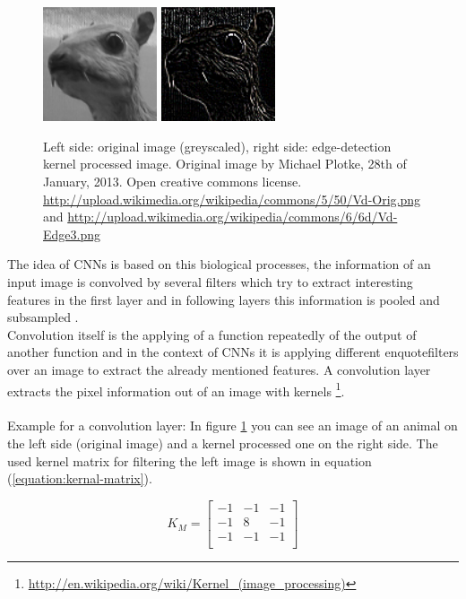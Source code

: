 \documentclass[12pt,twoside]{article}
\theoremstyle{plain}
\theoremstyle{definition}
\theoremstyle{remark}
\begin{document}
\begin{figure}
	\centerline{
		\includegraphics[width=0.3\textwidth]{animal-original.png}
		\qquad
		\includegraphics[width=0.3\textwidth]{animal-edge-detection.png}
	}
	{\caption{Left side: original image (greyscaled), right side: edge-detection kernel processed image. Original image by Michael Plotke, 28th of January, 2013. Open creative commons license.
			\protect\url{http://upload.wikimedia.org/wikipedia/commons/5/50/Vd-Orig.png} and \protect\url{http://upload.wikimedia.org/wikipedia/commons/6/6d/Vd-Edge3.png}}\label{fig:animal-edge-detection}}
\end{figure}
The idea of CNNs is based on this biological processes, the information of an input image is convolved by several filters which try to extract interesting features in the first layer and in following layers this information is pooled and subsampled \cite{ImangeNetClassificationCNN-Krizhevsky}.
\\
Convolution itself is the applying of a function repeatedly of the output of another function and in the context of CNNs it is applying different enquote{filters} over an image to extract the already mentioned features. A convolution layer extracts the pixel information out of an image with kernels \footnote{\url{http://en.wikipedia.org/wiki/Kernel_(image_processing)}}.
\\
\\
Example for a convolution layer: In figure \ref{fig:animal-edge-detection} you can see an image of an animal on the left side (original image) and a kernel processed one on the right side. The used kernel matrix for filtering the left image is shown in equation (\ref{equation:kernal-matrix}).
\begin{figure}
	\begin{equation}
		\label{equation:kernal-matrix}
		K_M =
		\begin{bmatrix}
		-1 & -1 & -1 \\
		-1 & 8 & -1 \\
		-1 & -1 & -1 \\
		\end{bmatrix}
	\end{equation}
\end{figure}
\end{document}
